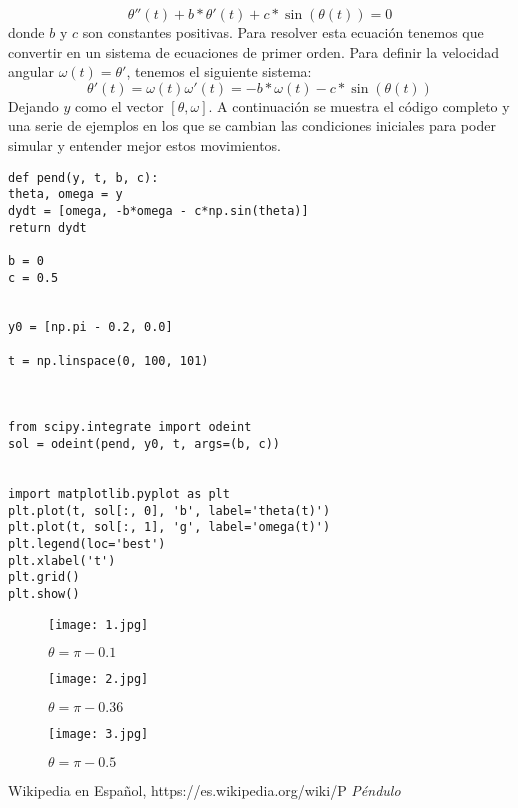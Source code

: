 \documentclass[12pt]{article}
\begin{document}
$$\theta''(t)+b*\theta'(t)+c*\sin(\theta(t))=0$$
donde $b$ y $c$ son constantes positivas.
Para resolver esta ecuación tenemos que convertir en un sistema de ecuaciones de primer orden. Para definir la velocidad angular
$\omega(t)=\theta'$, tenemos el siguiente sistema:
$$\theta'(t) = \omega(t)
\omega'(t) = -b*\omega(t) - c*\sin(\theta(t))$$
Dejando $y$ como el vector $[\theta, \omega]$. A continuación se muestra el código completo y una serie de ejemplos en los que se cambian las condiciones iniciales para poder simular y entender mejor estos movimientos.

\begin{verbatim}
def pend(y, t, b, c):
theta, omega = y
dydt = [omega, -b*omega - c*np.sin(theta)]
return dydt

b = 0
c = 0.5


y0 = [np.pi - 0.2, 0.0]

t = np.linspace(0, 100, 101)



from scipy.integrate import odeint
sol = odeint(pend, y0, t, args=(b, c))


import matplotlib.pyplot as plt
plt.plot(t, sol[:, 0], 'b', label='theta(t)')
plt.plot(t, sol[:, 1], 'g', label='omega(t)')
plt.legend(loc='best')
plt.xlabel('t')
plt.grid()
plt.show()
\end{verbatim}


\begin{figure}[H]
	\centering
\texttt{[image: 1.jpg]}	
\caption{$\theta=\pi - 0.1$}
\end{figure}

\begin{figure}[H]
	\centering
	\texttt{[image: 2.jpg]}	
	\caption{$\theta=\pi - 0.36$}
\end{figure}

\begin{figure}[H]
	\centering
	\texttt{[image: 3.jpg]}	
	\caption{$\theta=\pi - 0.5$}
\end{figure}


\begin{thebibliography}{9}
	
Wikipedia en Español, https://es.wikipedia.org/wiki/P%
	\emph{Péndulo}
	
		
\end{thebibliography}
\end{document}
